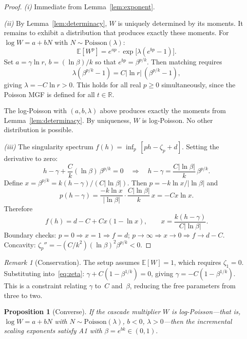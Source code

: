 \documentclass[12pt]{amsart}
\newtheorem{proposition}[theorem]{Proposition}
\theoremstyle{definition}
\theoremstyle{remark}
\newtheorem*{remark}{Remark}
\begin{document}
\begin{proof}
\textit{(i)} Immediate from Lemma~\ref{lem:exponent}.

\textit{(ii)} By Lemma~\ref{lem:determinacy}, $W$ is uniquely
determined by its moments.  It remains to exhibit a distribution that
produces exactly these moments.  For $\log W = a + bN$ with $N \sim
\mathrm{Poisson}(\lambda)$:
\[
  \mathbb{E}[W^p] = e^{ap} \cdot \exp\bigl[\lambda(e^{bp} - 1)\bigr].
\]
Set $a = \gamma\ln r$, $b = (\ln\beta)/k$ so that $e^{bp} =
\beta^{p/k}$.  Then matching requires
\[
  \lambda(\beta^{p/k} - 1) = C|\ln r|\,(\beta^{p/k} - 1),
\]
giving $\lambda = -C\ln r > 0$.  This holds for all real $p \geq 0$
simultaneously, since the Poisson MGF is defined for all $t \in
\mathbb{R}$.

The log-Poisson with $(a,b,\lambda)$ above produces exactly the
moments from Lemma~\ref{lem:determinacy}.  By uniqueness, $W$ is
log-Poisson.  No other distribution is possible.

\textit{(iii)}  The singularity spectrum $f(h) = \inf_p\,[ph -
\zeta_p + d]$.  Setting the derivative to zero:
\[
  h - \gamma + \frac{C}{k}(\ln\beta)\,\beta^{p/k} = 0
  \quad\Longrightarrow\quad
  h - \gamma = \frac{C|\ln\beta|}{k}\,\beta^{p/k}.
\]
Define $x = \beta^{p/k} = k(h-\gamma)/(C|\ln\beta|)$.  Then $p =
-k\ln x / |\ln\beta|$ and
\[
  p(h - \gamma) = \frac{-k\ln x}{|\ln\beta|}
    \cdot \frac{C|\ln\beta|}{k}\,x = -Cx\ln x.
\]
Therefore
\[
  f(h) = d - C + Cx(1 - \ln x), \qquad
  x = \frac{k(h-\gamma)}{C|\ln\beta|}.
\]
Boundary checks: $p = 0 \Rightarrow x = 1 \Rightarrow f = d$; $p \to
\infty \Rightarrow x \to 0 \Rightarrow f \to d - C$.  Concavity:
$\zeta_p'' = -(C/k^2)(\ln\beta)^2\beta^{p/k} < 0$.
\end{proof}


\begin{remark}[Conservation]
The setup assumes $\mathbb{E}[W] = 1$, which requires $\zeta_1 = 0$.
Substituting into~\eqref{eq:zeta}: $\gamma + C(1 - \beta^{1/k}) =
0$, giving $\gamma = -C(1-\beta^{1/k})$.  This is a constraint
relating $\gamma$ to~$C$ and~$\beta$, reducing the free parameters
from three to two.
\end{remark}


\begin{proposition}[Converse]\label{prop:converse}
If the cascade multiplier $W$ is log-Poisson---that is, $\log W = a +
bN$ with $N \sim \mathrm{Poisson}(\lambda)$, $b < 0$, $\lambda >
0$---then the incremental scaling exponents satisfy A1 with $\beta =
e^{bk} \in (0,1)$.
\end{proposition}
\end{document}
